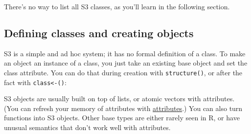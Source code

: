 \begin{Shaded}
\begin{Highlighting}[]
\NormalTok{(} \NormalTok{)}
\CommentTok{#>  [1] [.ts*            [<-.ts*          aggregate.ts    }
\CommentTok{#> }
\end{Highlighting}
\end{Shaded}

There's no way to list all S3 classes, as you'll learn in the following
section.

\subsection{Defining classes and creating objects}

S3 is a simple and ad hoc system; it has no formal definition of a
class. To make an object an instance of a class, you just take an
existing base object and set the class attribute. You can do that during
creation with \texttt{structure()}, or after the fact with
\texttt{class\textless{}-()}:  

\begin{Shaded}
\begin{Highlighting}[]
\StringTok{ }\NormalTok{(}\NormalTok{(), } \NormalTok{)}

\StringTok{ }\NormalTok{()}
\end{Highlighting}
\end{Shaded}

S3 objects are usually built on top of lists, or atomic vectors with
attributes. (You can refresh your memory of attributes with
\hyperref[attributes]{attributes}.) You can also turn functions into S3
objects. Other base types are either rarely seen in R, or have unusual
semantics that don't work well with attributes.

